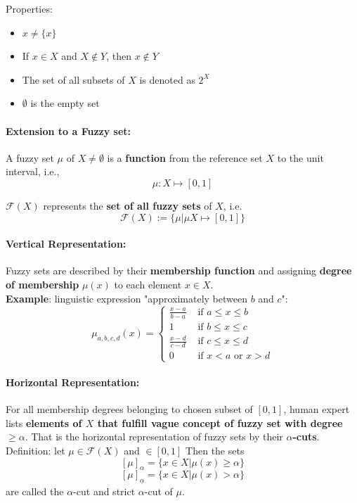 Properties: 
\begin{itemize}
	\item $x \neq \{x\}$
	\item If $x \in X$ and $X \notin Y$, then $x \notin Y$
	\item The set of all subsets of $X$ is denoted as $2^X$
	\item $\emptyset$ is the empty set
\end{itemize}

\paragraph{Extension to a Fuzzy set:} A fuzzy set $\mu$ of $X \neq \emptyset$ is a \textbf{function} from the reference set $X$ to the unit interval, i.e., $$\mu: X \mapsto [0,1]$$

$\mathcal{F}(X)$ represents the \textbf{set of all fuzzy sets} of $X$, i.e.
$$ \mathcal{F}(X) := \{\mu | \mu X \mapsto [0,1] \} $$

\paragraph{Vertical Representation:} Fuzzy sets are described by their \textbf{membership function} and assigning \textbf{degree of membership} $\mu (x)$ to each element $x \in X$.\\

\textbf{Example}: linguistic expression "approximately between $b$ and $c$": 
$$ \mu_{a,b,c,d} (x) = \begin{cases}
	\frac{x - a}{b - a} & \text{ if } a \leq x \leq b \\
	1 & \text{ if } b \leq x \leq c \\
	\frac{x - d}{c - d} & \text{ if } c \leq x \leq d \\
	0 & \text{ if } x < a \text{ or } x > d
\end{cases}$$

\newpage

\paragraph{Horizontal Representation:} For all membership degrees belonging to chosen subset of $[0,1]$, human expert lists \textbf{elements of $X$ that fulfill vague concept of fuzzy set with degree} $\geq \alpha$. That is the horizontal representation of fuzzy sets by their \textbf{$\alpha$-cuts}. Definition: let $\mu \in \mathcal{F}(X)$ and $\in [0,1]$ Then the sets
$$ [\mu]_\alpha = \{x \in X | \mu (x) \geq \alpha \} $$
$$ [\mu]_{\underline{\alpha}} = \{x \in X | \mu (x) > \alpha \}$$
are called the $\alpha$-cut and strict $\alpha$-cut of $\mu$.\\


